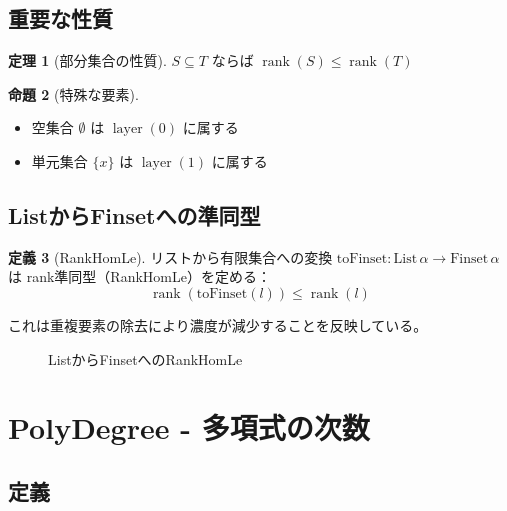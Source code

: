 \documentclass[a4paper,11pt]{ltjsarticle}
\theoremstyle{definition}
\newtheorem{definition}{定義}[section]
\newtheorem{theorem}[definition]{定理}
\newtheorem{proposition}[definition]{命題}
\newcommand{\rank}{\operatorname{rank}}
\newcommand{\layer}{\operatorname{layer}}
\begin{document}
\subsection{重要な性質}

\begin{theorem}[部分集合の性質]
$S \subseteq T$ ならば $\rank(S) \leq \rank(T)$
\end{theorem}

\begin{proposition}[特殊な要素]
\begin{itemize}
\item 空集合 $\emptyset$ は $\layer(0)$ に属する
\item 単元集合 $\{x\}$ は $\layer(1)$ に属する
\end{itemize}
\end{proposition}

\subsection{ListからFinsetへの準同型}

\begin{definition}[RankHomLe]
リストから有限集合への変換 $\text{toFinset} : \text{List}\,\alpha \to \text{Finset}\,\alpha$ は
rank準同型（RankHomLe）を定める：
\[
\rank(\text{toFinset}(l)) \leq \rank(l)
\]
\end{definition}

これは重複要素の除去により濃度が減少することを反映している。

\begin{figure}[h]
\centering
{}
\caption{ListからFinsetへのRankHomLe}
\label{fig:rankhomle}
\end{figure}

\section{PolyDegree - 多項式の次数}
\label{sec:polydegree}

\subsection{定義}
\end{document}
